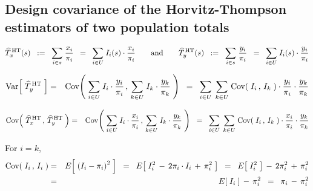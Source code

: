 

\subsection{Design covariance of the Horvitz-Thompson estimators of two population totals}

\vskip 0.5cm

\begin{equation*}
\widehat{T}^{\,\textnormal{HT}}_{x}(s)
\;\; := \;\;
	\underset{i \in s}{\sum}\; \dfrac{x_{i}}{\pi_{i}}
\;\; = \;\;
	\underset{i \in U}{\sum}\; I_{i}(s)\cdot\dfrac{x_{i}}{\pi_{i}}
\quad
\quad
\textnormal{and}
\quad
\quad
\widehat{T}^{\,\textnormal{HT}}_{y}(s)
\;\; := \;\;
	\underset{i \in s}{\sum}\; \dfrac{y_{i}}{\pi_{i}}
\;\; = \;\;
	\underset{i \in U}{\sum}\; I_{i}(s)\cdot\dfrac{y_{i}}{\pi_{i}}
\end{equation*}

\begin{eqnarray*}
\textnormal{Var}\!\left[\;\widehat{T}^{\,\textnormal{HT}}_{y}\;\right]
& = &
	\textnormal{Cov}\!\left(\;
		\underset{i \in U}{\sum}\; I_{i}\cdot\dfrac{y_{i}}{\pi_{i}}
		\,,\,
		\underset{k \in U}{\sum}\; I_{k}\cdot\dfrac{y_{k}}{\pi_{k}}
		\;\right)
\;\; = \;\;
	\underset{i \in U}{\sum}\;\,
	\underset{k \in U}{\sum}\;
		\textnormal{Cov}\!\left(\;I_{i}\,,\,I_{k}\;\right)
		\cdot\dfrac{y_{i}}{\pi_{i}}
		\cdot\dfrac{y_{k}}{\pi_{k}}
\end{eqnarray*}

\begin{eqnarray*}
\textnormal{Cov}\!\left(\;
	\widehat{T}^{\,\textnormal{HT}}_{x}
	\,,\,
	\widehat{T}^{\,\textnormal{HT}}_{y}
	\;\right)
& = &
	\textnormal{Cov}\!\left(\;
		\underset{i \in U}{\sum}\; I_{i}\cdot\dfrac{x_{i}}{\pi_{i}}
		\,,\,
		\underset{k \in U}{\sum}\; I_{k}\cdot\dfrac{y_{k}}{\pi_{k}}
		\;\right)
\;\; = \;\;
	\underset{i \in U}{\sum}\;\,
	\underset{k \in U}{\sum}\;
		\textnormal{Cov}\!\left(\;I_{i}\,,\,I_{k}\;\right)
		\cdot\dfrac{x_{i}}{\pi_{i}}
		\cdot\dfrac{y_{k}}{\pi_{k}}
\end{eqnarray*}

\noindent
For $i = k$,
\begin{eqnarray*}
\textnormal{Cov}\!\left(\;I_{i}\,,\,I_{i}\;\right)
& = &
	E\!\left[\;\left(I_{i}-\pi_{i}\right)^{2}\;\right]
\;\; = \;\;
	E\!\left[\;I_{i}^{2} \, - \, 2\pi_{i} \cdot I_{i} \,+\, \pi_{i}^{2}\;\right]
\;\; = \;\;
	E\!\left[\;I_{i}^{2}\;\right] \, - \, 2\pi_{i}^{2} \,+\, \pi_{i}^{2}
\\
& = &
	E\!\left[\;I_{i}\;\right] \, - \,\pi_{i}^{2}
\;\; = \;\;
	\pi_{i} \, - \,\pi_{i}^{2}
\end{eqnarray*}

